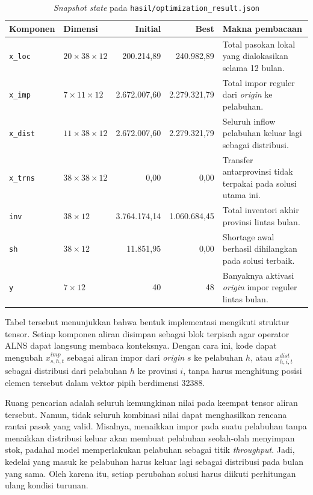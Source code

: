 \documentclass{file/TA-ITS}
\theoremstyle{definition}
\theoremstyle{definition}
\theoremstyle{plain}
\begin{document}
\begin{table}[H]
\centering
\caption{\textit{Snapshot state} pada \texttt{hasil/optimization\_result.json}}
\label{tab:state_snapshot_json}
\scriptsize
\begin{tabularx}{\textwidth}{@{}p{}p{}rrX@{}}
\toprule
\textbf{Komponen} & \textbf{Dimensi} & \textbf{Initial} & \textbf{Best} & \textbf{Makna pembacaan} \\
\midrule
\texttt{x\_loc} & $20 \times 38 \times 12$ & 200.214,89 & 240.982,89 & Total pasokan lokal yang dialokasikan selama 12 bulan. \\
\texttt{x\_imp} & $7 \times 11 \times 12$ & 2.672.007,60 & 2.279.321,79 & Total impor reguler dari \textit{origin} ke pelabuhan. \\
\texttt{x\_dist} & $11 \times 38 \times 12$ & 2.672.007,60 & 2.279.321,79 & Seluruh inflow pelabuhan keluar lagi sebagai distribusi. \\
\texttt{x\_trns} & $38 \times 38 \times 12$ & 0,00 & 0,00 & Transfer antarprovinsi tidak terpakai pada solusi utama ini. \\
\texttt{inv} & $38 \times 12$ & 3.764.174,14 & 1.060.684,45 & Total inventori akhir provinsi lintas bulan. \\
\texttt{sh} & $38 \times 12$ & 11.851,95 & 0,00 & Shortage awal berhasil dihilangkan pada solusi terbaik. \\
\texttt{y} & $7 \times 12$ & 40 & 48 & Banyaknya aktivasi \textit{origin} impor reguler lintas bulan. \\
\bottomrule
\end{tabularx}
\end{table}

Tabel tersebut menunjukkan bahwa bentuk implementasi mengikuti struktur tensor. Setiap komponen aliran disimpan sebagai blok terpisah agar operator ALNS dapat langsung membaca konteksnya. Dengan cara ini, kode dapat mengubah \(x^{imp}_{s,h,t}\) sebagai aliran impor dari \textit{origin} \(s\) ke pelabuhan \(h\), atau \(x^{dist}_{h,i,t}\) sebagai distribusi dari pelabuhan \(h\) ke provinsi \(i\), tanpa harus menghitung posisi elemen tersebut dalam vektor pipih berdimensi 32388.

Ruang pencarian adalah seluruh kemungkinan nilai pada keempat tensor aliran tersebut. Namun, tidak seluruh kombinasi nilai dapat menghasilkan rencana rantai pasok yang valid. Misalnya, menaikkan impor pada suatu pelabuhan tanpa menaikkan distribusi keluar akan membuat pelabuhan seolah-olah menyimpan stok, padahal model memperlakukan pelabuhan sebagai titik \textit{throughput}. Jadi, kedelai yang masuk ke pelabuhan harus keluar lagi sebagai distribusi pada bulan yang sama. Oleh karena itu, setiap perubahan solusi harus diikuti perhitungan ulang kondisi turunan.
\end{document}
